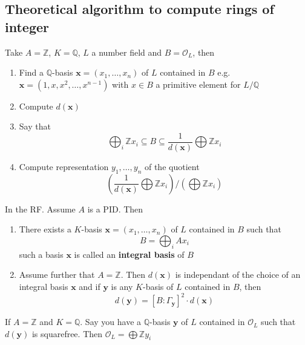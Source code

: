 \subsection{Theoretical algorithm to compute rings of integer}

Take \(A = \mathbb{Z}\), \(K = \mathbb{Q}\), \(L\) a number field and \(B =
\mathcal{O}_L\), then
\begin{enumerate}[label = \arabic*)]
    \item Find a \(\mathbb{Q}\)-basis \(\mathbf{x} = {(x_{1}, \dots, x_{n})}\)
        of \(L\) contained in \(B\) e.g. \(\mathbf{x} = {(1, x, x^2, \dots,
        x^{n-1})}\) with \(x \in B\) a primitive element for \(L / \mathbb{Q}\) 
    \item Compute \(d{(\mathbf{x} )}\) 
    \item Say that
        \[
          \bigoplus_{i} \mathbb{Z} x_{i} \subseteq B \subseteq
          \frac{1}{d{(\mathbf{x} )}} \bigoplus \mathbb{Z}x_{i}
        \]
    \item Compute representation \(y_{1}, \dots, y_{n}\) of the quotient
        \[
          {\left( \frac{1}{d{(\mathbf{x} )}} \bigoplus \mathbb{Z} x_{i}\right)}
          / {\left( \bigoplus \mathbb{Z} x_{i}\right)} 
        \]
\end{enumerate}

\begin{proposition}{}
    In the RF. Assume \(A\) is a PID. Then
\begin{enumerate}[label = \arabic*.]
    \item There exists a \(K\)-basis \(\mathbf{x} = {(x_{1}, \dots, x_{n})}\) of
        \(L\) contained in \(B\) such that
        \[
          B = \bigoplus_{i} A x_{i}
        \]
        such a basis \(\mathbf{x} \) is called an \textbf{integral basis} of \(B\) 
    \item Assume further that \(A = \mathbb{Z}\). Then \(d{(\mathbf{x} )}\) is
        independant of the choice of an integral basis \(\mathbf{x} \) and if
        \(\mathbf{y} \) is any \(K\)-basis of \(L\) contained in \(B\), then 
        \[
            d{(\mathbf{y} )} = [ B : \Gamma_\mathbf{y} ]^{2} \cdot d{(\mathbf{x} )}
        \]
\end{enumerate}
\end{proposition}
\begin{remark}{}
    If \(A = \mathbb{Z}\) and \(K = \mathbb{Q}\). Say you have a
    \(\mathbb{Q}\)-basis \(\mathbf{y} \) of \(L\) contained in \(\mathcal{O}_L\)
    such that \(d{(\mathbf{y} )}\) is squarefree. Then \(\mathcal{O}_L =
    \bigoplus \mathbb{Z} y_{i}\) 
\end{remark}

